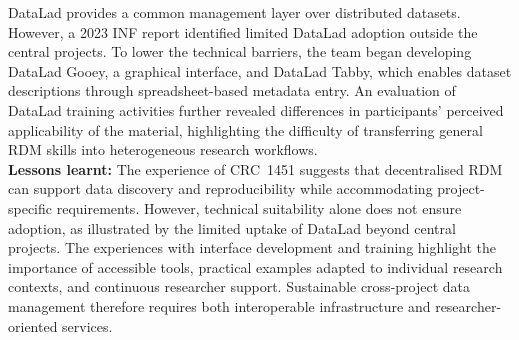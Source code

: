 \documentclass{eceasst}
\begin{document}
DataLad provides a common management layer over distributed
datasets.
However, a 2023 INF report \cite{szczepanik_2023_8355962} identified limited DataLad adoption outside the central projects.
To lower the technical barriers, the team began developing DataLad Gooey, a graphical interface,
and DataLad Tabby, which enables dataset descriptions through
spreadsheet-based metadata entry.
An evaluation of DataLad training activities further revealed differences in participants' perceived applicability of the
material, highlighting the difficulty of transferring general
RDM skills into heterogeneous research workflows.
\\
\noindent\textbf{Lessons learnt:}
The experience of CRC~1451 suggests that decentralised
RDM can support data discovery and reproducibility
while accommodating project-specific requirements.
However, technical suitability alone does not ensure
adoption, as illustrated by the limited uptake of
DataLad beyond central projects.
The experiences with interface development and training
highlight the importance of accessible tools, practical
examples adapted to individual research contexts,
and continuous researcher support.
Sustainable cross-project data management therefore
requires both interoperable infrastructure and
researcher-oriented services.

\end{document}
